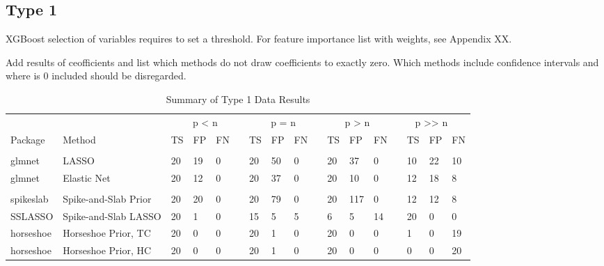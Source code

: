 \documentclass[
  11pt,
]{article}
\begin{document}
\subsection{Type 1}

XGBoost selection of variables requires to set a threshold. For feature
importance list with weights, see Appendix XX.

Add results of ceofficients and list which methods do not draw
coefficients to exactly zero. Which methods include confidence intervals
and where is 0 included should be disregarded.

\begin{table}[!h]

\caption{\label{tab:Results T1}Summary of Type 1 Data Results}
\centering
\fontsize{8.5}{10.5}\selectfont
\begin{tabular}[t]{>{}l|>{}l|>{}l|>{}l|>{}l|>{}l|>{}l|>{}l|>{}l|>{}l|>{}l|>{}l|>{}l|>{}l|>{}l|>{}l|>{}l|}
\toprule
\multicolumn{2}{c}{ } & \multicolumn{4}{c}{p < n} & \multicolumn{4}{c}{p = n} & \multicolumn{3}{c}{p > n} & \multicolumn{4}{c}{p >> n} \\
\cmidrule(l{3pt}r{3pt}){3-6} \cmidrule(l{3pt}r{3pt}){7-10} \cmidrule(l{3pt}r{3pt}){11-13} \cmidrule(l{3pt}r{3pt}){14-17}
Package & Method & TS & FP & FN &  & TS & FP & FN &  & TS & FP & FN &  & TS & FP & FN\\
\midrule
\addlinespace[0.3em]
\multicolumn{17}{l}{\textbf{Frequentist Methods}}\\
\hspace{1em}glmnet & LASSO & 20 & 19 & 0 &  & 20 & 50 & 0 &  & 20 & 37 & 0 &  & 10 & 22 & 10\\
\hspace{1em}glmnet & Elastic Net & 20 & 12 & 0 &  & 20 & 37 & 0 &  & 20 & 10 & 0 &  & 12 & 18 & 8\\
\addlinespace[0.3em]
\multicolumn{17}{l}{\textbf{Bayesian Methods}}\\
\hspace{1em}spikeslab & Spike-and-Slab Prior & 20 & 20 & 0 &  & 20 & 79 & 0 &  & 20 & 117 & 0 &  & 12 & 12 & 8\\
\hspace{1em}SSLASSO & Spike-and-Slab LASSO & 20 & 1 & 0 &  & 15 & 5 & 5 &  & 6 & 5 & 14 &  & 20 & 0 & 0\\
\hspace{1em}horseshoe & Horseshoe Prior, TC & 20 & 0 & 0 &  & 20 & 1 & 0 &  & 20 & 0 & 0 &  & 1 & 0 & 19\\
\hspace{1em}horseshoe & Horseshoe Prior, HC & 20 & 0 & 0 &  & 20 & 1 & 0 &  & 20 & 0 & 0 &  & 0 & 0 & 20\\

\end{tabular}
\end{table}
\end{document}
